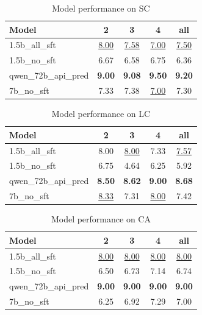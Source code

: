 \begin{table}[ht]
\centering
\begin{tabular}{lcccc}
\toprule
Model & 2 & 3 & 4 & all \\
\midrule
1.5b\_all\_sft & \underline{8.00} & \underline{7.58} & \underline{7.00} & \underline{7.50} \\
1.5b\_no\_sft & 6.67 & 6.58 & 6.75 & 6.36 \\
qwen\_72b\_api\_pred & \textbf{9.00} & \textbf{9.08} & \textbf{9.50} & \textbf{9.20} \\
7b\_no\_sft & 7.33 & 7.38 & \underline{7.00} & 7.30 \\
\bottomrule
\end{tabular}
\caption{Model performance on SC}
\label{tab:sc}
\end{table}

\begin{table}[ht]
\centering
\begin{tabular}{lcccc}
\toprule
Model & 2 & 3 & 4 & all \\
\midrule
1.5b\_all\_sft & 8.00 & \underline{8.00} & 7.33 & \underline{7.57} \\
1.5b\_no\_sft & 6.75 & 4.64 & 6.25 & 5.92 \\
qwen\_72b\_api\_pred & \textbf{8.50} & \textbf{8.62} & \textbf{9.00} & \textbf{8.68} \\
7b\_no\_sft & \underline{8.33} & 7.31 & \underline{8.00} & 7.42 \\
\bottomrule
\end{tabular}
\caption{Model performance on LC}
\label{tab:lc}
\end{table}

\begin{table}[ht]
\centering
\begin{tabular}{lcccc}
\toprule
Model & 2 & 3 & 4 & all \\
\midrule
1.5b\_all\_sft & \underline{8.00} & \underline{8.00} & \underline{8.00} & \underline{8.00} \\
1.5b\_no\_sft & 6.50 & 6.73 & 7.14 & 6.74 \\
qwen\_72b\_api\_pred & \textbf{9.00} & \textbf{9.00} & \textbf{9.00} & \textbf{9.00} \\
7b\_no\_sft & 6.25 & 6.92 & 7.29 & 7.00 \\
\bottomrule
\end{tabular}
\caption{Model performance on CA}
\label{tab:ca}
\end{table}

